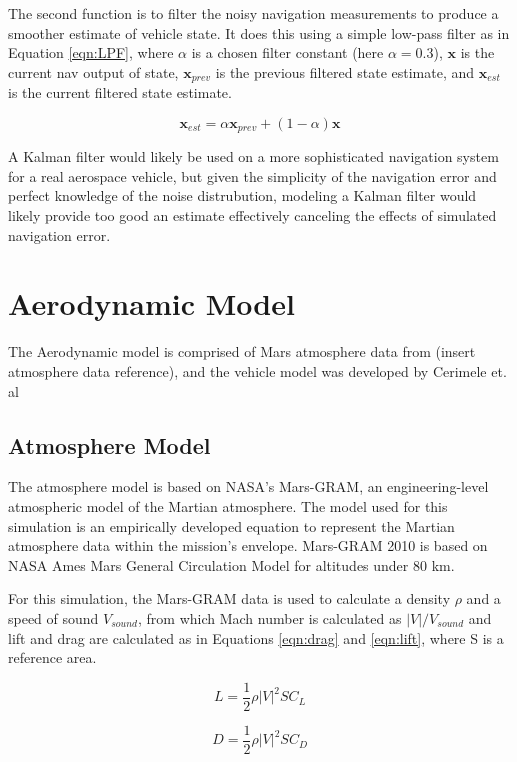 The second function is to filter the noisy navigation measurements to produce a smoother estimate of vehicle state. It does this using a simple low-pass filter as in Equation \ref{eqn:LPF}, where $\alpha$ is a chosen filter constant (here $\alpha = 0.3$), $\bm{x}$ is the current nav output of state, $\bm{x}_{prev}$ is the previous filtered state estimate, and $\bm{x}_{est}$ is the current filtered state estimate. 

\begin{equation}
\label{eqn:LPF}
\bm{x}_{est} = \alpha \bm{x}_{prev} + (1-\alpha) \bm{x}
\end{equation}

A Kalman filter would likely be used on a more sophisticated navigation system for a real aerospace vehicle, but given the simplicity of the navigation error and perfect knowledge of the noise distrubution, modeling a Kalman filter would likely provide too good an estimate effectively canceling the effects of simulated navigation error.

\section{Aerodynamic Model}
The Aerodynamic model is comprised of Mars atmosphere data from (insert atmosphere data reference), and the vehicle model was developed by Cerimele et. al\:\cite{CERIMELE}

\subsection{Atmosphere Model}
The atmosphere model is based on NASA's Mars-GRAM\:\cite{MARSGRAM}, an engineering-level atmospheric model of the Martian atmosphere. The model used for this simulation is an empirically developed equation to represent the Martian atmosphere data within the mission's envelope. Mars-GRAM 2010 is based on NASA Ames Mars General Circulation Model for altitudes under 80 km.

For this simulation, the Mars-GRAM data is used to calculate a density $\rho$ and a speed of sound $V_{sound}$, from which Mach number is calculated as $|V|/V_{sound}$ and lift and drag are calculated as in Equations \ref{eqn:drag} and \ref{eqn:lift}, where S is a reference area.

\begin{equation}
\label{eqn:lift}
L = \frac{1}{2} \rho |V|^2 S C_L
\end{equation}

\begin{equation}
\label{eqn:drag}
D = \frac{1}{2} \rho |V|^2 S C_D
\end{equation}

